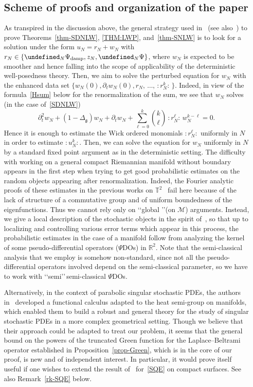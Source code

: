 \documentclass[AHL,Unicode,longabstracts,published]{cedram}
\newcommand{\damp}{\textup{damp}}
\newcommand{\R}{\mathbb{R}}
\newcommand{\T}{\mathbb{T}}
\let\P= \undefined
\newcommand{\P}{\mathbf{P}}
\newcommand{\M}{\mathcal{M}}
\newcommand{\g}{\mathfrak{g}}
\newcommand{\Dlg}{\Delta_{\g}}
\newcommand{\dt}{\partial_t}
\begin{document}
\subsection{Scheme of proofs and organization of the paper}
As transpired in the discussion above, the general strategy used in~\cite{DPD} (see also~\cite{McKean,BO96}) to prove Theorems~\ref{thm-SDNLW}, \ref{THM:LWP}, and~\ref{thm-SNLW} is to look for a solution under the form $u_N=r_N+w_N$ with $r_N\in\{\P_N\Psi_{\damp},z_N,\P_N\Psi\}$, where $w_N$ is expected to be smoother and hence falling into the scope of applicability of the deterministic well-posedness theory. Then, we aim to solve the perturbed equation for $w_N$ with the enhanced data set $\{w_N(0),\dt w_N(0),r_N,\,\dots,\,:\!r_N^k\!:\,\}$. Indeed, in view of the formula~\eqref{Hsum} below for the renormalization of the sum, we see that $w_N$ solves (in the case of~\eqref{SDNLW})
\begin{equation}\label{eq-w-r}
\dt^2w_N +(1-\Dlg)w_N +\dt w_N + \sum_{\ell=0}^k{\binom k \ell}\,:\!r_N^{\ell}\!:\,w_N^{k-\ell} = 0.
\end{equation}
Hence it is enough to estimate the Wick ordered monomials $:r_N^{\ell}:$ uniformly in $N$ in order to estimate $:\!u_N^k\!:$. Then, we can solve the equation for $w_N$ uniformly in $N$ by a standard fixed point argument as in the deterministic setting. The difficulty with working on a general compact Riemannian manifold without boundary appears in the first step when trying to get good probabilistic estimates on the random objects appearing after renormalization. Indeed, the Fourier analytic proofs of these estimates in the previous works on $\T^2$~\cite{OT1,OT2,GKO} fail here because of the lack of structure of a commutative group and of uniform boundedness of the eigenfunctions. Thus we cannot rely only on \lq\lq global \rq\rq (on $\M$) arguments. Instead, we give a local description of the stochastic objects in the spirit of~\cite{BGT}, so that up to localizing and controlling various error terms which appear in this process, the probabilistic estimates in the case of a manifold follow from analyzing the kernel of some pseudo-differential operators ($\Psi$DOs) in $\R^2$. Note that the semi-classical analysis that we employ is somehow non-standard, since not all the pseudo-differential operators involved depend on the semi-classical parameter, so we have to work with \lq\lq semi\rq\rq\,semi-classical $\Psi$DOs.

Alternatively, in the context of parabolic singular stochastic PDEs, the authors in~\cite{BB} developed a functional calculus adapted to the heat semi-group on manifolds, which enabled them to build a robust and general theory for the study of singular stochastic PDEs in a more complex geometrical setting. Though we believe that their approach could be adapted to treat our problem, it seems that the general bound on the powers of the truncated Green function for the Laplace--Beltrami operator established in Proposition~\ref{prop-Green}, which is in the core of our proof, is new and of independent interest. In particular, it would prove itself useful if one wishes to extend the result of~\cite{DPD} for~\eqref{SQE} on compact surfaces. See also Remark~\ref{rk-SQE} below.
\end{document}
